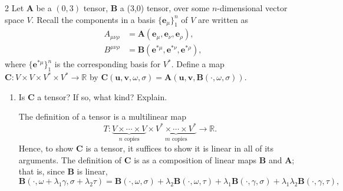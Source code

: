 \documentclass[11pt]{article}
\begin{document}
\begin{problem}{2}
	Let \( \mathbf{A} \) be a \( (0,3) \) tensor, \( \mathbf{B} \) a (3,0) tensor, over some \( n \)-dimensional vector space \( V \).
	Recall the components in a basis \( \{\mathbf{e}_{\mu}\}_1^n \) of \( V \) are written as
	\begin{equation}
		\label{eq:1}
		\begin{aligned}
			A_{\mu\nu\rho} & = \mathbf{A}(\mathbf{e}_{\mu}, \mathbf{e}_{\nu}, \mathbf{e}_{\rho}),    \\[.5em]
			B^{\mu\nu\rho} & = \mathbf{B}(\mathbf{e}^{*\mu}, \mathbf{e}^{*\nu}, \mathbf{e}^{*\rho}),
		\end{aligned}
	\end{equation}
	where \( \{\mathbf{e}^{*\mu}\}_1^n \) is the corresponding basis for \( V^{*} \).
	Define a map \( \mathbf{C}: V \times V \times V^{*} \times V^{*} \rightarrow \mathbb{R} \) by \( \mathbf{C}(\mathbf{u}, \mathbf{v}, \omega, \sigma) = \mathbf{A}(\mathbf{u}, \mathbf{v}, \mathbf{B}(\cdot, \omega, \sigma)) \).

	\begin{enumerate}[label=(\alph*)]
		\item Is \( \mathbf{C} \) a tensor?
		      If so, what kind?
		      Explain.
		      \begin{answer}
			      The definition of a tensor is a multilinear map
			      \begin{equation}
				      T: \underbrace{V \times \cdots \times V}_{n \text{ copies}} \times \underbrace{V^{*} \times \cdots \times V^{*}}_{m \text{ copies}} \rightarrow \mathbb{R}.
			      \end{equation}
			      Hence, to show \( \mathbf{C} \) is a tensor, it suffices to show it is linear in all of its arguments.
			      The definition of \( \mathbf{C} \) is as a composition of linear maps \( \mathbf{B} \) and \( \mathbf{A} \); that is, since \( \mathbf{B} \) is linear,
			      \begin{equation}
				      \label{eq:10}
				      \mathbf{B}(\cdot, \omega + \lambda_1\gamma, \sigma + \lambda_2\tau) = \mathbf{B}(\cdot, \omega, \sigma) + \lambda_2\mathbf{B}(\cdot, \omega, \tau) + \lambda_1\mathbf{B}(\cdot, \gamma, \sigma) + \lambda_1\lambda_2\mathbf{B}(\cdot, \gamma, \tau),
			      \end{equation}


\end{answer}
\end{enumerate}
\end{problem}
\end{document}
